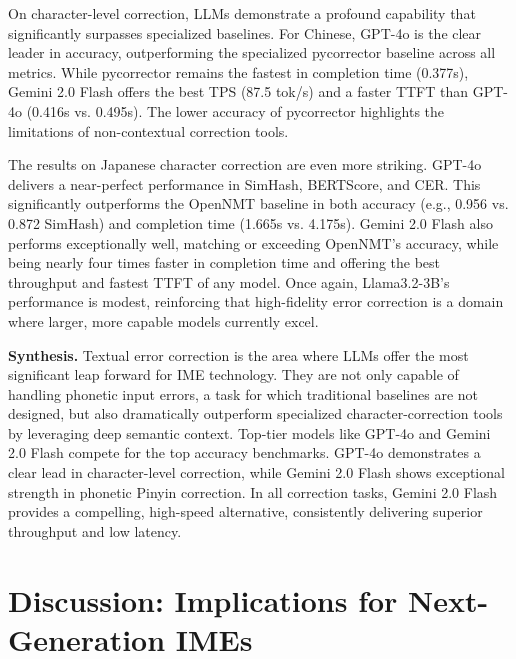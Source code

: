 \documentclass[10pt, a4paper]{article}
\begin{document}
On character-level correction, LLMs demonstrate a profound capability that significantly surpasses specialized baselines. For Chinese, {GPT-4o} is the clear leader in accuracy, outperforming the specialized {{pycorrector}} baseline across all metrics. While {{pycorrector}} remains the fastest in completion time (0.377s), {Gemini 2.0 Flash} offers the best TPS (87.5 tok/s) and a faster TTFT than GPT-4o (0.416s vs. 0.495s). The lower accuracy of {{pycorrector}} highlights the limitations of non-contextual correction tools.

The results on Japanese character correction are even more striking. {GPT-4o} delivers a near-perfect performance in SimHash, BERTScore, and CER.  This significantly outperforms the {OpenNMT} baseline in both accuracy (e.g., 0.956 vs. 0.872 SimHash) and completion time (1.665s vs. 4.175s). {Gemini 2.0 Flash} also performs exceptionally well, matching or exceeding {OpenNMT}'s accuracy, while being nearly four times faster in completion time and offering the best throughput and fastest TTFT of any model. Once again, {Llama3.2-3B}'s performance is modest, reinforcing that high-fidelity error correction is a domain where larger, more capable models currently excel.

\textbf{Synthesis.}
Textual error correction is the area where LLMs offer the most significant leap forward for IME technology. They are not only capable of handling phonetic input errors, a task for which traditional baselines are not designed, but also dramatically outperform specialized character-correction tools by leveraging deep semantic context. Top-tier models like {GPT-4o} and {Gemini 2.0 Flash} compete for the top accuracy benchmarks. {GPT-4o} demonstrates a clear lead in character-level correction, while {Gemini 2.0 Flash} shows exceptional strength in phonetic Pinyin correction. In all correction tasks, {Gemini 2.0 Flash} provides a compelling, high-speed alternative, consistently delivering superior throughput and low latency.

\section{Discussion: Implications for Next-Generation IMEs}
\end{document}
